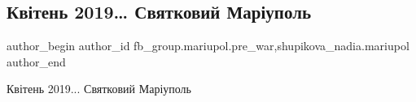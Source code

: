  
 
 
 
 

\subsection{Квітень 2019… Святковий Маріуполь}
\label{sec:16_04_2023.fb.fb_group.mariupol.pre_war.3.kviten_2019_svjatkovyj_mariupol}
 
\ifcmt
 author_begin
   author_id fb_group.mariupol.pre_war,shupikova_nadia.mariupol
 author_end
\fi

Квітень 2019... Святковий Маріуполь

